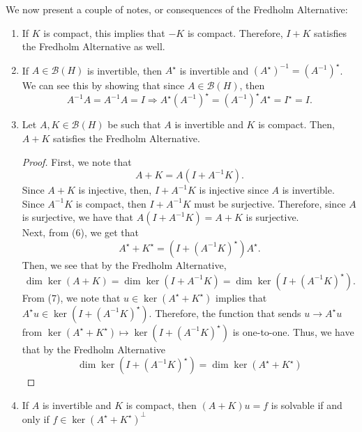 \documentclass[12pt]{article}
\newcommand{\B}{\mathscr{B}}
\newcommand{\Ks}{K^{\star}}
\newcommand{\As}{A^{\star}}
\newcommand{\Ai}{A^{-1}}
\begin{document}
We now present a couple of notes, or consequences of the Fredholm Alternative:
\begin{enumerate}[topsep=-15pt]
\item If $K$ is compact, this implies that $-K$ is compact. Therefore, $I + K$ satisfies the Fredholm Alternative as well.
\item If $A \in \B(H)$ is invertible, then $A^{\star}$ is invertible and $(\As)^{-1} = (A^{-1})^{\star}$. We can see this by showing that since $A \in \B(H)$, then 
\[ A^{-1} A = A^{-1} A = I \Longrightarrow \As(A^{-1})^{\star} = (A^{-1})^{\star} \As = I^{\star} = I.\]
\item Let $A, K \in \B(H)$ be such that $A$ is invertible and $K$ is compact. Then, $A + K$ satisfies the Fredholm Alternative. 
\begin{proof}
First, we note that 
\begin{equation}
A + K = A( I + \Ai K).
\end{equation}
Since $A+ K$ is injective, then, $I + \Ai K$ is injective since $A$ is invertible. Since $\Ai K$ is compact, then $I + \Ai K$ must be surjective. Therefore, since $A$ is surjective, we have that $A(I + \Ai K) =  A + K$ is surjective. \\
\indent Next, from (6), we get that 
\begin{equation}
\As + \Ks = \left(I + (\Ai K)^{\star}\right) \As.
\end{equation}
Then, we see that by the Fredholm Alternative,
\[ \dim \ker(A + K) = \dim \ker( I + \Ai K) = \dim \ker \left(I + (\Ai K)^{\star} \right).\]
From (7), we note that $u \in \ker(\As + \Ks)$ implies that $\As u \in \ker\left(I + (\Ai K)^{\star}\right)$. Therefore, the function that sends $u \to \As u$ from $\ker(\As + \Ks) \mapsto \ker\left(I + (\Ai K)^{\star}\right)$ is one-to-one. Thus, we have that by the Fredholm Alternative
\[ \dim\ker\left(I + (\Ai K)^{\star}\right) = \dim\ker(\As + \Ks)\]
\end{proof}
\item If $A$ is invertible and $K$ is compact, then $(A+ K) u = f$ is solvable if and only if $f \in \ker(\As + \Ks)^{\perp}$
\end{enumerate}
\end{document}
